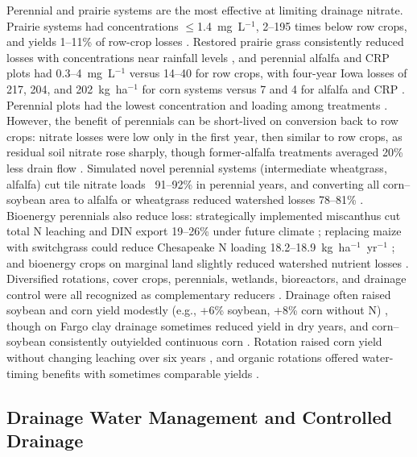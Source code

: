 Perennial and prairie systems are the most effective at limiting drainage nitrate. Prairie systems had concentrations $\le$1.4~mg~L$^{-1}$, 2--195 times below row crops, and yields 1--11\% of row-crop losses \parencite{Daigh2015b}. Restored prairie grass consistently reduced losses with concentrations near rainfall levels \parencite{HernandezRamirez2011}, and perennial alfalfa and CRP plots had 0.3--4~mg~L$^{-1}$ versus 14--40 for row crops, with four-year Iowa losses of 217, 204, and 202~kg~ha$^{-1}$ for corn systems versus 7 and 4 for alfalfa and CRP \parencite{Randall2001}. Perennial plots had the lowest concentration and loading among treatments \parencite{Waring2024}. However, the benefit of perennials can be short-lived on conversion back to row crops: nitrate losses were low only in the first year, then similar to row crops, as residual soil nitrate rose sharply, though former-alfalfa treatments averaged 20\% less drain flow \parencite{Huggins2001}. Simulated novel perennial systems (intermediate wheatgrass, alfalfa) cut tile nitrate loads ~91--92\% in perennial years, and converting all corn--soybean area to alfalfa or wheatgrass reduced watershed losses 78--81\% \parencite{Wilson2023}. Bioenergy perennials also reduce loss: strategically implemented miscanthus cut total N leaching and DIN export 19--26\% under future climate \parencite{Ferin2023}; replacing maize with switchgrass could reduce Chesapeake N loading 18.2--18.9~kg~ha$^{-1}$~yr$^{-1}$ \parencite{Woodbury2018}; and bioenergy crops on marginal land slightly reduced watershed nutrient losses \parencite{Guo2018}. Diversified rotations, cover crops, perennials, wetlands, bioreactors, and drainage control were all recognized as complementary reducers \parencite{Dinnes2002}. Drainage often raised soybean and corn yield modestly (e.g., +6\% soybean, +8\% corn without N) \parencite{Cassman2025}, though on Fargo clay drainage sometimes reduced yield in dry years, and corn--soybean consistently outyielded continuous corn \parencite{Acharya2019b}. Rotation raised corn yield without changing leaching over six years \parencite{Bakhsh2005}, and organic rotations offered water-timing benefits with sometimes comparable yields \parencite{Logsdon2021}.

\subsection{Drainage Water Management and Controlled Drainage}

